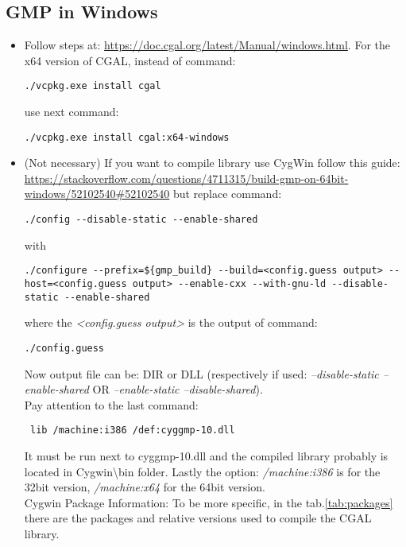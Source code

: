 \documentclass[11pt, english, openany]{report}
\begin{document}
\begin{appendices}
\subsection{GMP in Windows} \label{sec:cgalLib}
\begin{itemize}
\item Follow steps at: \href{https://doc.cgal.org/latest/Manual/windows.html}{https://doc.cgal.org/latest/Manual/windows.html}. For the x64 version of CGAL, instead of command:
\begin{lstlisting}
./vcpkg.exe install cgal
\end{lstlisting}
 use next command:
\begin{lstlisting}
./vcpkg.exe install cgal:x64-windows   
\end{lstlisting}
\item (Not necessary) If you want to compile library use CygWin follow this guide: \\ \href{https://stackoverflow.com/questions/4711315/build-gmp-on-64bit-windows/52102540#52102540}{https://stackoverflow.com/questions/4711315/build-gmp-on-64bit-windows/52102540\#52102540} but replace command:
\begin{lstlisting}
./config --disable-static --enable-shared
\end{lstlisting}
with
\begin{lstlisting}
./configure --prefix=${gmp_build} --build=<config.guess output> --host=<config.guess output> --enable-cxx --with-gnu-ld --disable-static --enable-shared
\end{lstlisting}
where the \textit{<config.guess output>} is the output of command: 
\begin{lstlisting}
./config.guess
\end{lstlisting}
Now output file can be: DIR or DLL (respectively if used: \textit{--disable-static --enable-shared} OR \textit{--enable-static --disable-shared}).\\
Pay attention to the last command:
\begin{lstlisting}
 lib /machine:i386 /def:cyggmp-10.dll 
\end{lstlisting}
It must be run next to cyggmp-10.dll and the compiled library probably is located in Cygwin\textbackslash bin folder.
Lastly the option: \textit{/machine:i386} is for the 32bit version, \textit{/machine:x64} for the 64bit version. \\
\newline
Cygwin Package Information: To be more specific, in the tab.\ref{tab:packages} there are the packages and relative versions used to compile the CGAL library.

\end{itemize}
\end{appendices}
\end{document}
